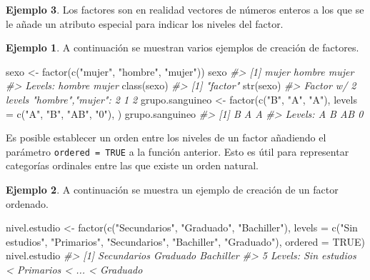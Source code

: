 \documentclass[
]{book}
\newenvironment{Shaded}{\begin{snugshade}}{\end{snugshade}}
\newcommand{\AttributeTok}[1]{\textcolor[rgb]{0.77,0.63,0.00}{#1}}
\newcommand{\CommentTok}[1]{\textcolor[rgb]{0.56,0.35,0.01}{\textit{#1}}}
\newcommand{\ConstantTok}[1]{\textcolor[rgb]{0.00,0.00,0.00}{#1}}
\newcommand{\FunctionTok}[1]{\textcolor[rgb]{0.00,0.00,0.00}{#1}}
\newcommand{\NormalTok}[1]{#1}
\newcommand{\OtherTok}[1]{\textcolor[rgb]{0.56,0.35,0.01}{#1}}
\newcommand{\StringTok}[1]{\textcolor[rgb]{0.31,0.60,0.02}{#1}}
\theoremstyle{definition}
\theoremstyle{definition}
\newtheorem{example}{Ejemplo}[chapter]
\theoremstyle{definition}
\theoremstyle{definition}
\theoremstyle{remark}
\begin{document}
\begin{example}
Los factores son en realidad vectores de números enteros a los que se le añade un atributo especial para indicar los niveles del factor.

\begin{example}

A continuación se muestran varios ejemplos de creación de factores.

\begin{Shaded}
\begin{Highlighting}[]
\NormalTok{sexo }\OtherTok{\textless{}{-}} \FunctionTok{factor}\NormalTok{(}\FunctionTok{c}\NormalTok{(}\StringTok{"mujer"}\NormalTok{, }\StringTok{"hombre"}\NormalTok{, }\StringTok{"mujer"}\NormalTok{))}
\NormalTok{sexo}
\CommentTok{\#\textgreater{} [1] mujer  hombre mujer }
\CommentTok{\#\textgreater{} Levels: hombre mujer}
\FunctionTok{class}\NormalTok{(sexo)}
\CommentTok{\#\textgreater{} [1] "factor"}
\FunctionTok{str}\NormalTok{(sexo)}
\CommentTok{\#\textgreater{}  Factor w/ 2 levels "hombre","mujer": 2 1 2}
\NormalTok{grupo.sanguineo }\OtherTok{\textless{}{-}} \FunctionTok{factor}\NormalTok{(}\FunctionTok{c}\NormalTok{(}\StringTok{"B"}\NormalTok{, }\StringTok{"A"}\NormalTok{, }\StringTok{"A"}\NormalTok{), }\AttributeTok{levels =} \FunctionTok{c}\NormalTok{(}\StringTok{"A"}\NormalTok{, }\StringTok{"B"}\NormalTok{, }\StringTok{"AB"}\NormalTok{, }\StringTok{"0"}\NormalTok{), )}
\NormalTok{grupo.sanguineo}
\CommentTok{\#\textgreater{} [1] B A A}
\CommentTok{\#\textgreater{} Levels: A B AB 0}
\end{Highlighting}
\end{Shaded}

\end{example}

Es posible establecer un orden entre los niveles de un factor añadiendo el parámetro \texttt{ordered\ =\ TRUE} a la función anterior. Esto es útil para representar categorías ordinales entre las que existe un orden natural.

\begin{example}

A continuación se muestra un ejemplo de creación de un factor ordenado.

\begin{Shaded}
\begin{Highlighting}[]
\NormalTok{nivel.estudio }\OtherTok{\textless{}{-}} \FunctionTok{factor}\NormalTok{(}\FunctionTok{c}\NormalTok{(}\StringTok{"Secundarios"}\NormalTok{, }\StringTok{"Graduado"}\NormalTok{, }\StringTok{"Bachiller"}\NormalTok{), }\AttributeTok{levels =} \FunctionTok{c}\NormalTok{(}\StringTok{"Sin estudios"}\NormalTok{, }\StringTok{"Primarios"}\NormalTok{, }\StringTok{"Secundarios"}\NormalTok{, }\StringTok{"Bachiller"}\NormalTok{, }\StringTok{"Graduado"}\NormalTok{), }\AttributeTok{ordered =} \ConstantTok{TRUE}\NormalTok{)}
\NormalTok{nivel.estudio}
\CommentTok{\#\textgreater{} [1] Secundarios Graduado    Bachiller  }
\CommentTok{\#\textgreater{} 5 Levels: Sin estudios \textless{} Primarios \textless{} ... \textless{} Graduado}
\end{Highlighting}
\end{Shaded}


\end{example}
\end{example}
\end{document}
